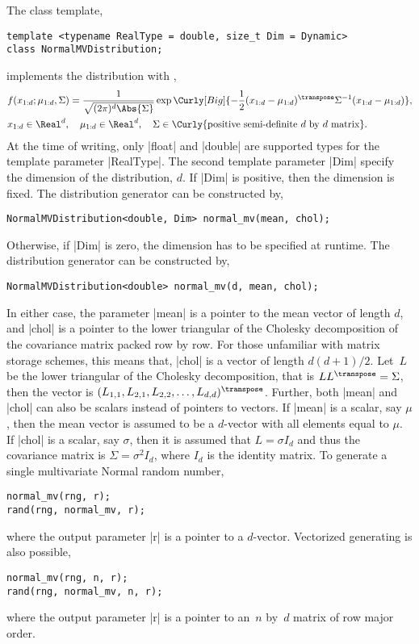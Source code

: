 The class template,
\begin{verbatim}
template <typename RealType = double, size_t Dim = Dynamic>
class NormalMVDistribution;
\end{verbatim}
implements the distribution with \pdf,
\begin{align*}
  &f(x_{1:d};\mu_{1:d},\Sigma) = \frac{1}{\sqrt{(2\pi)^d\Abs{\Sigma}}}
  \exp\Curly[Big]{-\frac{1}{2}(x_{1:d} -
  \mu_{1:d})^{\transpose}\Sigma^{-1}(x_{1:d} - \mu_{1:d})},\\
  &x_{1:d}\in\Real^d,\quad
  \mu_{1:d}\in\Real^d,\quad
  \Sigma\in
  \Curly{\text{positive semi-definite }d\text{ by }d\text{ matrix}}.
\end{align*}
At the time of writing, only |float| and |double| are supported types for the
template parameter |RealType|. The second template parameter |Dim| specify the
dimension of the distribution, $d$. If |Dim| is positive, then the dimension is
fixed. The distribution generator can be constructed by,
\begin{verbatim}
NormalMVDistribution<double, Dim> normal_mv(mean, chol);
\end{verbatim}
Otherwise, if |Dim| is zero, the dimension has to be specified at runtime. The
distribution generator can be constructed by,
\begin{verbatim}
NormalMVDistribution<double> normal_mv(d, mean, chol);
\end{verbatim}
In either case, the parameter |mean| is a pointer to the mean vector of length
$d$, and |chol| is a pointer to the lower triangular of the Cholesky
decomposition of the covariance matrix packed row by row. For those unfamiliar
with matrix storage schemes, this means that, |chol| is a vector of length
$d(d+1)/2$. Let~$L$ be the lower triangular of the Cholesky decomposition, that
is $LL^{\transpose} = \Sigma$, then the vector is
$(L_{1,1},L_{2,1},L_{2,2},\dots,L_{d,d})^{\transpose}$. Further, both |mean|
and |chol| can also be scalars instead of pointers to vectors. If |mean| is a
scalar, say $\mu$, then the mean vector is assumed to be a $d$-vector with all
elements equal to $\mu$. If |chol| is a scalar, say $\sigma$, then it is
assumed that $L = \sigma I_d$ and thus the covariance matrix is $\Sigma =
\sigma^2 I_d$, where $I_d$ is the identity matrix. To generate a single
multivariate Normal random number,
\begin{verbatim}
normal_mv(rng, r);
rand(rng, normal_mv, r);
\end{verbatim}
where the output parameter |r| is a pointer to a $d$-vector. Vectorized
generating is also possible,
\begin{verbatim}
normal_mv(rng, n, r);
rand(rng, normal_mv, n, r);
\end{verbatim}
where the output parameter |r| is a pointer to an~$n$ by~$d$ matrix of row
major order.
